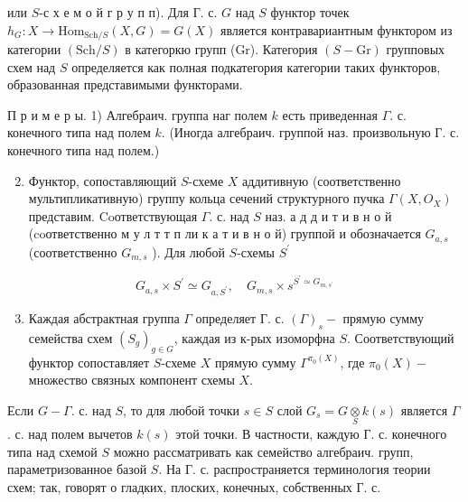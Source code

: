 \documentclass[10pt]{article}
\begin{document}
или $S$-с х е м о й г р у п п). Для Г. с. $G$ над $S$ функтор точек $h_{G}: X \longrightarrow \mathrm{Hom}_{\mathrm{Sch} / S}(X, G)=G(X)$ является контравариантным функтором из категории $(\mathrm{Sch} / S)$ в категоркю групп (Gr). Категория $(S-\mathrm{Gr})$ групповых схем над $S$ определяется как полная подкатегория категории таких функторов, образованная представимыми функторами.



П р и м е р ы. 1) Алгебраич. группа наг полем $k$ есть приведенная $\Gamma$. с. конечного типа над полем $k$. (Иногда алгебраич. группой наз. произвольную Г. с. конечного типа над полем.)



\begin{enumerate}

  \setcounter{enumi}{1}

  \item Функтор, сопоставляющий $S$-схеме $X$ аддитивную (соответственно мультипликативную) группу кольца сечений структурного пучка $\Gamma\left(X, O_{X}\right)$ представим. Coответствующая $\Gamma$. с. над $S$ наз. а д д и т и в н о й (coответственно м у л т т п ли к а т и в н о й) группой и обозначается $G_{a, s}$ (соответственно $G_{m, s}$ ). Для любой $S$-схемы $S^{\prime}$

\end{enumerate}



\[

G_{a, s} \times S^{\prime} \simeq G_{a, S^{\prime}}, \quad G_{m, s} \times s^{S^{\prime} \simeq G_{m, s^{\prime}}}

\]



\begin{enumerate}

  \setcounter{enumi}{2}

  \item Каждая абстрактная группа $\Gamma$ определяет $Г$. с. $(\Gamma)_{s}-$ прямую сумму семейства схем $\left(S_{g}\right)_{g \in G}$, каждая из к-рых изоморфна $S$. Соответствующий функтор сопоставляет $S$-схеме $X$ прямую сумму $\Gamma^{\pi_{0}(X)}$, где $\pi_{0}(X)-$ множество связных компонент схемы $X$.

\end{enumerate}



Если $G-\Gamma$. с. над $S$, то для любой точки $s \in S$ слой $G_{s}=G \underset{S}{\otimes} k(s)$ является $\Gamma$. с. над полем вычетов $k(s)$ этой точки. В частности, каждую Г. с. конечного типа над схемой $S$ можно рассматривать как семейство алгебраич. групп, параметризованное базой $S$. На Г. с. распространяется терминология теории схем; так, говорят о гладких, плоских, конечных, собственных Г. с.
\end{document}
